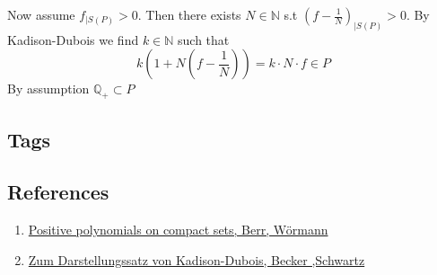 \documentclass[
]{article}
\providecommand{\tightlist}{%
  \setlength{\itemsep}{0pt}\setlength{\parskip}{0pt}}
\begin{document}
Now assume \(f_{\vert S(P)}> 0\). Then there exists \(N \in \mathbb N\)
s.t \((f-\frac 1 N)_{\vert S(P)} > 0\). By Kadison-Dubois we find
\(k \in \mathbb N\) such that
\[ k(1+N(f-\frac 1 N)) = k \cdot N \cdot f \in P\] By assumption
\(\mathbb Q_+ \subset P\)

\hypertarget{tags}{%
\subsection{Tags}\label{tags}}

\hypertarget{references}{%
\subsection{References}\label{references}}

\begin{enumerate}
\def\labelenumi{\arabic{enumi}.}
\tightlist
\item
  \href{https://www.researchgate.net/publication/226463524_Positive_polynomials_on_compact_sets}{Positive
  polynomials on compact sets, Berr, Wörmann}
\item
  \href{https://link.springer.com/article/10.1007/BF01192806}{Zum
  Darstellungssatz von Kadison-Dubois, Becker ,Schwartz}
\end{enumerate}
\end{document}

